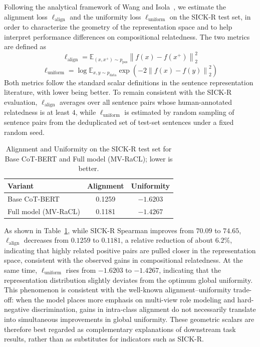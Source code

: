 \documentclass[lettersize,journal]{IEEEtran}
\begin{document}
Following the analytical framework of Wang and Isola~\cite{alignment}, we estimate the alignment loss $\ell_{\mathrm{align}}$ and the uniformity loss $\ell_{\mathrm{uniform}}$ on the SICK-R test set, in order to characterize the geometry of the representation space and to help interpret performance differences on compositional relatedness. The two metrics are defined as
\begin{equation}
\ell_{\mathrm{align}}
=
\mathbb{E}_{(x,x^{+})\sim p_{\mathrm{pos}}}
\left\lVert f(x)-f(x^{+}) \right\rVert_2^{2}
\end{equation}
\begin{equation}
\ell_{\mathrm{uniform}}
=
\log \mathbb{E}_{x,y\sim p_{\mathrm{data}}}
\exp\!\left(-2\left\lVert f(x)-f(y) \right\rVert_2^{2}\right)
\end{equation}
Both metrics follow the standard scalar definitions in the sentence representation literature, with lower being better. To remain consistent with the SICK-R evaluation, $\ell_{\mathrm{align}}$ averages over all sentence pairs whose human-annotated relatedness is at least $4$, while $\ell_{\mathrm{uniform}}$ is estimated by random sampling of sentence pairs from the deduplicated set of test-set sentences under a fixed random seed.

\begin{table}[!htbp]
\centering
\caption{Alignment and Uniformity on the SICK-R test set for Base CoT-BERT and Full model (MV-RaCL); lower is better.}
\label{tab:au}
\begin{tabular}{lcc}
\toprule
Variant & Alignment & Uniformity \\
\midrule
Base CoT-BERT        & 0.1259 & $-1.6203$ \\
Full model (MV-RaCL) & 0.1181 & $-1.4267$ \\
\bottomrule
\end{tabular}
\end{table}

As shown in Table~\ref{tab:au}, while SICK-R Spearman improves from $70.09$ to $74.65$, $\ell_{\mathrm{align}}$ decreases from $0.1259$ to $0.1181$, a relative reduction of about $6.2\%$, indicating that highly related positive pairs are pulled closer in the representation space, consistent with the observed gains in compositional relatedness. At the same time, $\ell_{\mathrm{uniform}}$ rises from $-1.6203$ to $-1.4267$, indicating that the representation distribution slightly deviates from the optimum global uniformity. This phenomenon is consistent with the well-known alignment--uniformity trade-off: when the model places more emphasis on multi-view role modeling and hard-negative discrimination, gains in intra-class alignment do not necessarily translate into simultaneous improvements in global uniformity. These geometric scalars are therefore best regarded as complementary explanations of downstream task results, rather than as substitutes for indicators such as SICK-R.
\end{document}
